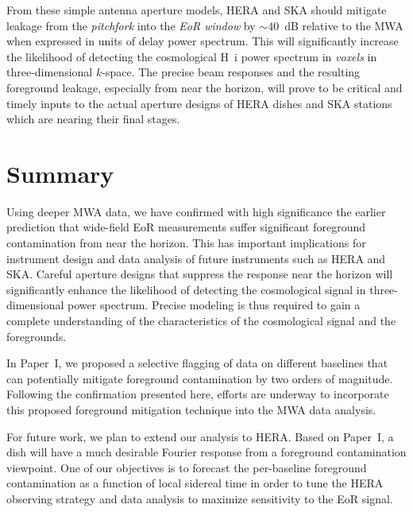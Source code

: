 \documentclass[preprint2,apjl,numberedappendix,twocolappendix,appendixfloats]{emulateapj}
\begin{document}
From these simple antenna aperture models, HERA and SKA should mitigate leakage from the {\it pitchfork} into the {\it EoR window} by $\sim 40$~dB relative to the MWA when expressed in units of delay power spectrum. This will significantly increase the likelihood of detecting the cosmological H~{\sc i} power spectrum in {\it voxels} in three-dimensional $k$-space. The precise beam responses and the resulting foreground leakage, especially from near the horizon, will prove to be critical and timely inputs to the actual aperture designs of HERA dishes and SKA stations which are nearing their final stages.

\section{Summary}\label{sec:summary}

Using deeper MWA data, we have confirmed with high significance the earlier prediction that wide-field EoR measurements suffer significant foreground contamination from near the horizon. This has important implications for instrument design and data analysis of future instruments such as HERA and SKA. Careful aperture designs that suppress the response near the horizon will significantly enhance the likelihood of detecting the cosmological signal in three-dimensional power spectrum. Precise modeling is thus required to gain a complete understanding of the characteristics of the cosmological signal and the foregrounds. 

In Paper~I, we proposed a selective flagging of data on different baselines that can potentially mitigate foreground contamination by two orders of magnitude. Following the confirmation presented here, efforts are underway to incorporate this proposed foreground mitigation technique into the MWA data analysis.

For future work, we plan to extend our analysis to HERA. Based on Paper~I, a dish will have a much desirable Fourier response from a foreground contamination viewpoint. One of our objectives is to forecast the per-baseline foreground contamination as a function of local sidereal time in order to tune the HERA observing strategy and data analysis to maximize sensitivity to the EoR signal.

\acknowledgments
\end{document}
